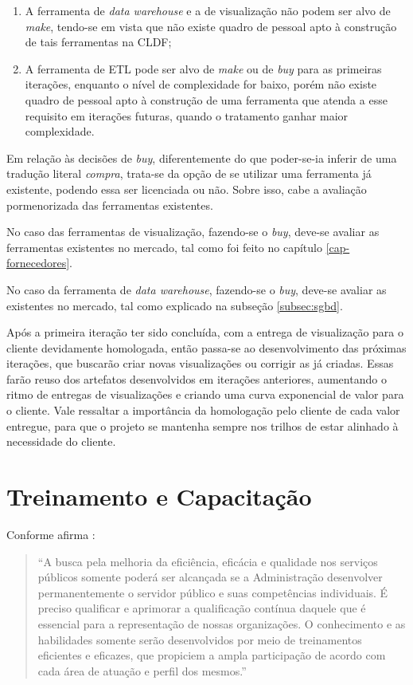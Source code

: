 \begin{enumerate}
    \item A ferramenta de \emph{data warehouse} e a de visualização não podem ser alvo de \emph{make}, tendo-se em vista que não existe quadro de pessoal apto à construção de tais ferramentas na CLDF;
    \item A ferramenta de ETL pode ser alvo de \emph{make} ou de \emph{buy} para as primeiras iterações, enquanto o nível de complexidade for baixo, porém não existe quadro de pessoal apto à construção de uma ferramenta que atenda a esse requisito em iterações futuras, quando o tratamento ganhar maior complexidade.
\end{enumerate}

Em relação às decisões de \emph{buy}, diferentemente do que poder-se-ia inferir de uma tradução literal \emph{compra}, trata-se da opção de se utilizar uma ferramenta já existente, podendo essa ser licenciada ou não. Sobre isso, cabe a avaliação pormenorizada das ferramentas existentes. 

No caso das ferramentas de visualização, fazendo-se o \emph{buy}, deve-se avaliar as ferramentas existentes no mercado, tal como foi feito no capítulo \ref{cap-fornecedores}.

No caso da ferramenta de \emph{data warehouse}, fazendo-se o \emph{buy}, deve-se avaliar as existentes no mercado, tal como explicado na subseção \ref{subsec:sgbd}.

Após a primeira iteração ter sido concluída, com a entrega de visualização para o cliente devidamente homologada, então passa-se ao desenvolvimento das próximas iterações, que buscarão criar novas visualizações ou corrigir as já criadas. Essas farão reuso dos artefatos desenvolvidos em iterações anteriores, aumentando o ritmo de entregas de visualizações e criando uma curva exponencial de valor para o cliente. Vale ressaltar a importância da homologação pelo cliente de cada valor entregue, para que o projeto se mantenha sempre nos trilhos de estar alinhado à necessidade do cliente.

\section{Treinamento e Capacitação}

    Conforme afirma \cite{treinamento}:

    \begin{quote}
        ``A busca pela melhoria da eficiência, eficácia e qualidade nos serviços públicos somente poderá ser alcançada se a Administração desenvolver permanentemente o servidor público e suas competências individuais. É preciso qualificar e aprimorar a qualificação contínua daquele que é essencial para a representação de nossas organizações. O conhecimento e as habilidades somente serão desenvolvidos por meio de treinamentos eficientes e eficazes, que propiciem a ampla participação de acordo com cada área de atuação e perfil dos mesmos.''
    \end{quote}
    
